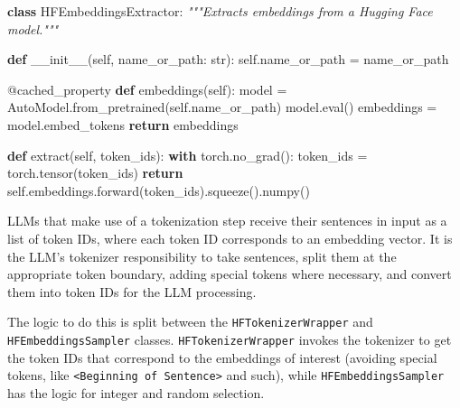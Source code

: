 \documentclass[
  a4paper, twoside, 10pt, titlepage]{book}
\newenvironment{Shaded}{}{}
\newcommand{\AttributeTok}[1]{\textcolor[rgb]{0.49,0.56,0.16}{#1}}
\newcommand{\BuiltInTok}[1]{\textcolor[rgb]{0.00,0.50,0.00}{#1}}
\newcommand{\CommentTok}[1]{\textcolor[rgb]{0.38,0.63,0.69}{\textit{#1}}}
\newcommand{\ControlFlowTok}[1]{\textcolor[rgb]{0.00,0.44,0.13}{\textbf{#1}}}
\newcommand{\FunctionTok}[1]{\textcolor[rgb]{0.02,0.16,0.49}{#1}}
\newcommand{\KeywordTok}[1]{\textcolor[rgb]{0.00,0.44,0.13}{\textbf{#1}}}
\newcommand{\NormalTok}[1]{#1}
\newcommand{\OperatorTok}[1]{\textcolor[rgb]{0.40,0.40,0.40}{#1}}
\newcommand{\VariableTok}[1]{\textcolor[rgb]{0.10,0.09,0.49}{#1}}
\begin{document}
\begin{Shaded}
\begin{Highlighting}[]
\KeywordTok{class}\NormalTok{ HFEmbeddingsExtractor:}
    \CommentTok{"""Extracts embeddings from a Hugging Face model."""}

    \KeywordTok{def} \FunctionTok{\_\_init\_\_}\NormalTok{(}\VariableTok{self}\NormalTok{, name\_or\_path: }\BuiltInTok{str}\NormalTok{):}
        \VariableTok{self}\NormalTok{.name\_or\_path }\OperatorTok{=}\NormalTok{ name\_or\_path}

    \AttributeTok{@cached\_property}
    \KeywordTok{def}\NormalTok{ embeddings(}\VariableTok{self}\NormalTok{):}
\NormalTok{        model }\OperatorTok{=}\NormalTok{ AutoModel.from\_pretrained(}\VariableTok{self}\NormalTok{.name\_or\_path)}
\NormalTok{        model.}\BuiltInTok{eval}\NormalTok{()}
\NormalTok{        embeddings }\OperatorTok{=}\NormalTok{ model.embed\_tokens}
        \ControlFlowTok{return}\NormalTok{ embeddings}

    \KeywordTok{def}\NormalTok{ extract(}\VariableTok{self}\NormalTok{, token\_ids):}
        \ControlFlowTok{with}\NormalTok{ torch.no\_grad():}
\NormalTok{            token\_ids }\OperatorTok{=}\NormalTok{ torch.tensor(token\_ids)}
            \ControlFlowTok{return} \VariableTok{self}\NormalTok{.embeddings.forward(token\_ids).squeeze().numpy()}
\end{Highlighting}
\end{Shaded}

LLMs that make use of a tokenization step receive their sentences in
input as a list of token IDs, where each token ID corresponds to an
embedding vector. It is the LLM's tokenizer responsibility to take
sentences, split them at the appropriate token boundary, adding special
tokens where necessary, and convert them into token IDs for the LLM
processing.

The logic to do this is split between the \texttt{HFTokenizerWrapper}
and \texttt{HFEmbeddingsSampler} classes. \texttt{HFTokenizerWrapper}
invokes the tokenizer to get the token IDs that correspond to the
embeddings of interest (avoiding special tokens, like
\texttt{\textless{}Beginning\ of\ Sentence\textgreater{}} and such),
while \texttt{HFEmbeddingsSampler} has the logic for integer and random
selection.
\end{document}
